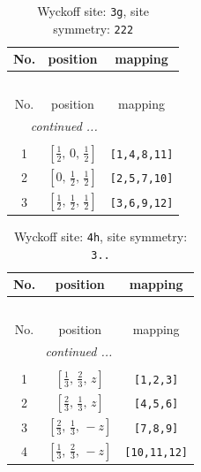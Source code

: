 \documentclass[fleqn,8pt]{jsarticle}
\begin{document}
\begin{longtable}{ccc}
\caption{Wyckoff site: {\tt 3g}, site symmetry: {\tt 222}}
 \\
 \hline \hline
No. & position & mapping \\ \hline \endfirsthead

\multicolumn{2}{l}{\tablename\ \thetable{}} \\
 \hline \hline
No. & position & mapping \\ \hline \endhead

 \hline \hline
\multicolumn{2}{r}{\footnotesize\it continued ...} \\ \endfoot

 \hline \hline
\multicolumn{2}{r}{} \\ \endlastfoot

1 & $\left[ \frac{1}{2},\, 0,\, \frac{1}{2} \right]$ & {\tt [1,4,8,11]} \\ \hline
2 & $\left[ 0,\, \frac{1}{2},\, \frac{1}{2} \right]$ & {\tt [2,5,7,10]} \\ \hline
3 & $\left[ \frac{1}{2},\, \frac{1}{2},\, \frac{1}{2} \right]$ & {\tt [3,6,9,12]} \\
\end{longtable}
\renewcommand{\arraystretch}{1.2}
\begin{longtable}{ccc}
\caption{Wyckoff site: {\tt 4h}, site symmetry: {\tt 3..}}
 \\
 \hline \hline
No. & position & mapping \\ \hline \endfirsthead

\multicolumn{2}{l}{\tablename\ \thetable{}} \\
 \hline \hline
No. & position & mapping \\ \hline \endhead

 \hline \hline
\multicolumn{2}{r}{\footnotesize\it continued ...} \\ \endfoot

 \hline \hline
\multicolumn{2}{r}{} \\ \endlastfoot

1 & $\left[ \frac{1}{3},\, \frac{2}{3},\, z \right]$ & {\tt [1,2,3]} \\ \hline
2 & $\left[ \frac{2}{3},\, \frac{1}{3},\, z \right]$ & {\tt [4,5,6]} \\ \hline
3 & $\left[ \frac{2}{3},\, \frac{1}{3},\, - z \right]$ & {\tt [7,8,9]} \\ \hline
4 & $\left[ \frac{1}{3},\, \frac{2}{3},\, - z \right]$ & {\tt [10,11,12]} \\
\end{longtable}
\end{document}
